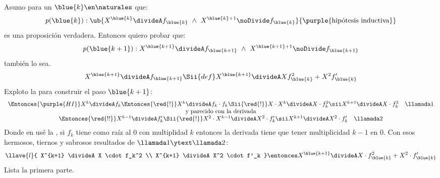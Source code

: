 \begin{enumerate}[label=\roman*)]
\begin{enumerate}[label=\violet{(\arabic*)}]
                Asumo para un $\blue{k} \en \naturales$ que:
                $$
                  p(\blue{k}) : \ub{
                    X^{\blue{k}} \divideA f_{\blue{k}}
                    ~\land~
                    X^{\blue{k} + 1} \noDivide f_{\blue{k}}
                  }{
                    \text{\purple{hipótesis inductiva}}
                  }
                $$
                es una proposición verdadera. Entonces quiero probar que:
                $$
                  p(\blue{k + 1}) : X^{\blue{k+1}} \divideA f_{\blue{k+1}}
                  ~\land~
                  X^{\blue{k + 1} + 1} \noDivide f_{\blue{k+1}}
                $$
                también lo sea.
                $$
                  X^{\blue{k+1}} \divideA f_{\blue{k+1}}
                  \Sii{def}
                  X^{\blue{k+1}} \divideA Xf_{\blue{k}}^2 + X^2f'_{\blue{k}}
                $$
                Exploto la  para construir el paso $\blue{k+1}$:
                $$
                  \begin{array}{c}
                    \Entonces{\purple{HI}}
                    X^k \divideA f_k
                    \Entonces{\red{!}}
                    X^k \divideA f_k \cdot f_k
                    \Sii{\red{!}}
                    X \cdot X^k \divideA X\cdot f_k^2
                    \sii
                    X^{k+1} \divideA X \cdot f_k^2  \quad \llamada1 \\
                    \text{y parecido con la derivada}               \\
                    \Entonces{\red{!!}}	      X^{k-1} \divideA f'_k
                    \Sii{\red{!}}
                    X^2 \cdot X^{k-1} \divideA X^2 \cdot f'_k
                    \sii
                    X^{k+1} \divideA X^2 \cdot f'_k \quad \llamada2
                  \end{array}
                $$
                Donde en \red{!!} usé la , si $f_k$ tiene como raíz al 0 con multiplidad $k$ entonces la derivada tiene que
                tener multiplicidad $k-1$ en 0.
                Con esos hermosos, tiernos y sabrosos resultados de $\llamada1 \ytext \llamada2$:
                $$
                  \llave{l}{
                    X^{k+1} \divideA X \cdot f_k^2  \\
                    X^{k+1} \divideA X^2 \cdot f'_k
                  }
                  \entonces
                  X^{\blue{k+1}} \divideA X \cdot f_{\blue{k}}^2 +  X^2 \cdot f'_{\blue{k}}
                $$
                Lista la primera parte.


\end{enumerate}
\end{enumerate}
